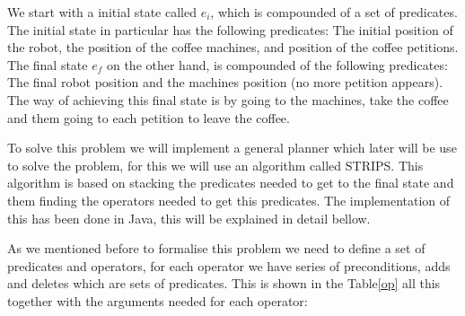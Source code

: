 \documentclass[12pt,a4paper,oneside]{article}
\numberwithin{equation}{section}
\numberwithin{equation}{section}
\theoremstyle{definition}
\begin{document}
We start with a initial state called $e_i$, which is compounded of a set of predicates. The initial state in particular has the following predicates: The initial position of the robot, the position of the coffee machines, and position of the coffee petitions.  The final state $e_f$ on the other hand, is compounded of the following predicates: The final robot position and the machines position (no more petition appears). The way of achieving this final state is by going to the machines, take the coffee and them going to each petition to leave the coffee.

To solve this problem we will implement a general planner which later will be use to solve the problem, for this we will use an algorithm called STRIPS. This algorithm is based on stacking the predicates needed to get to the final state and them finding the operators needed to get this predicates. The implementation of this has been done in Java, this will be explained in detail bellow.

As we mentioned before to formalise this problem we need to define a set of predicates and operators, for each operator we have series of preconditions, adds and deletes which are sets of predicates. This is shown in the Table\ref{op} all this together with the arguments needed for each operator:
\end{document}
